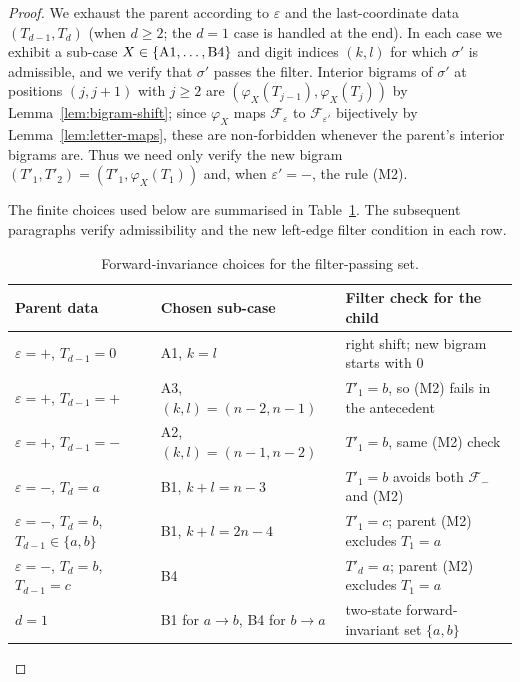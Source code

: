 \documentclass{amsart}
\theoremstyle{definition}
\theoremstyle{remark}
\begin{document}
\begin{proof}
We exhaust the parent according to $\varepsilon$ and the
last-coordinate data $(T_{d-1}, T_d)$ \textup{(}when $d \ge 2$;
the $d = 1$ case is handled at the end\textup{)}.  In each case
we exhibit a sub-case $X \in \{\textup{A1}, \ldots, \textup{B4}\}$
and digit indices $(k, l)$ for which $\sigma'$ is admissible, and
we verify that $\sigma'$ passes the filter.  Interior bigrams of
$\sigma'$ at positions $(j, j+1)$ with $j \ge 2$ are
$(\varphi_X(T_{j-1}), \varphi_X(T_j))$ by
Lemma~\ref{lem:bigram-shift}; since $\varphi_X$ maps
$\mathcal{F}_\varepsilon$ to $\mathcal{F}_{\varepsilon'}$ bijectively
by Lemma~\ref{lem:letter-maps}, these are non-forbidden whenever
the parent's interior bigrams are.  Thus we need only verify the
new bigram $(T'_1, T'_2) = (T'_1, \varphi_X(T_1))$ and, when
$\varepsilon' = -$, the rule \textup{(M2)}.

The finite choices used below are summarised in
Table~\ref{tab:forward-invariance-check}.  The subsequent
paragraphs verify admissibility and the new left-edge filter
condition in each row.

\begin{table}[ht]
\centering
\footnotesize
\caption{Forward-invariance choices for the filter-passing set.}
\label{tab:forward-invariance-check}
\begin{tabular}{@{}p{}p{}p{}@{}}
\toprule
Parent data & Chosen sub-case & Filter check for the child \\
\midrule
$\varepsilon=+$, $T_{d-1}=0$ & A1, $k=l$ & right shift; new bigram starts with $0$ \\
$\varepsilon=+$, $T_{d-1}=+$ & A3, $(k,l)=(n-2,n-1)$ & $T'_1=b$, so \textup{(M2)} fails in the antecedent \\
$\varepsilon=+$, $T_{d-1}=-$ & A2, $(k,l)=(n-1,n-2)$ & $T'_1=b$, same \textup{(M2)} check \\
$\varepsilon=-$, $T_d=a$ & B1, $k+l=n-3$ & $T'_1=b$ avoids both $\mathcal F_-$ and \textup{(M2)} \\
$\varepsilon=-$, $T_d=b$, $T_{d-1}\in\{a,b\}$ & B1, $k+l=2n-4$ & $T'_1=c$; parent \textup{(M2)} excludes $T_1=a$ \\
$\varepsilon=-$, $T_d=b$, $T_{d-1}=c$ & B4 & $T'_d=a$; parent \textup{(M2)} excludes $T_1=a$ \\
$d=1$ & B1 for $a\to b$, B4 for $b\to a$ & two-state forward-invariant set $\{a,b\}$ \\
\bottomrule
\end{tabular}
\end{table}


\end{proof}
\end{document}
